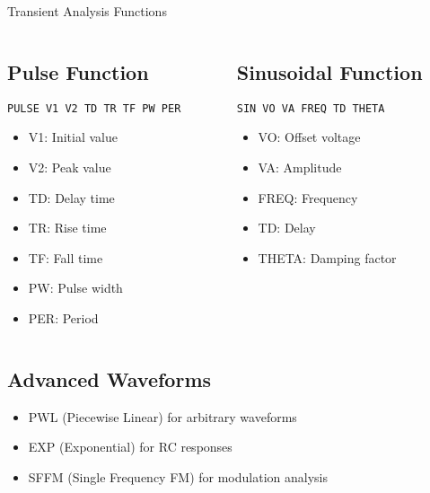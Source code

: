 \documentclass{beamer}
\begin{document}
\begin{frame}{Transient Analysis Functions}
    \begin{columns}
        \begin{column}{0.5\textwidth}
            \subsection{Pulse Function}
            \texttt{PULSE V1 V2 TD TR TF PW PER}
            \begin{itemize}
                \item V1: Initial value
                \item V2: Peak value
                \item TD: Delay time
                \item TR: Rise time
                \item TF: Fall time
                \item PW: Pulse width
                \item PER: Period
            \end{itemize}
        \end{column}
        \begin{column}{0.5\textwidth}
            \subsection{Sinusoidal Function}
            \texttt{SIN VO VA FREQ TD THETA}
            \begin{itemize}
                \item VO: Offset voltage
                \item VA: Amplitude
                \item FREQ: Frequency
                \item TD: Delay
                \item THETA: Damping factor
            \end{itemize}
        \end{column}
    \end{columns}
    
    \subsection{Advanced Waveforms}
    \begin{itemize}
        \item PWL (Piecewise Linear) for arbitrary waveforms
        \item EXP (Exponential) for RC responses
        \item SFFM (Single Frequency FM) for modulation analysis
    \end{itemize}
\end{frame}
\end{document}

